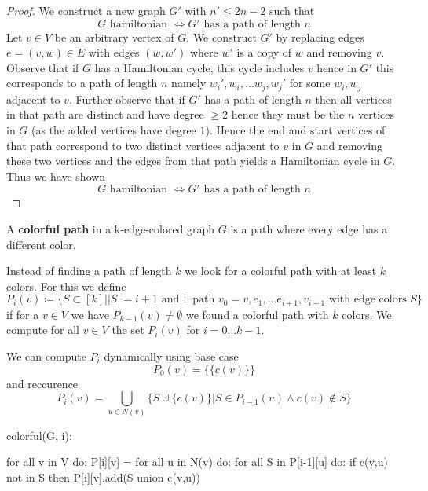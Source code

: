 \begin{proof}
	We construct a new graph $G'$ with $n' \leq 2n-2$ such that
	$$G \text{ hamiltonian } \iff G' \text{ has a path of length } n$$
	Let $v \in V$ be an arbitrary vertex of $G$. We construct $G'$ by replacing edges $e = (v, w) \in E$ with edges $(w, w')$ where $w'$ is a copy of $w$ and removing $v$.
	Observe that if $G$ has a Hamiltonian cycle, this cycle includes $v$ hence in $G'$ this corresponds to a path of length $n$ namely $w_i', w_i, \dots w_j, w_j'$ for some $w_i, w_j$ adjacent to $v$.
	Further observe that if $G'$ has a path of length $n$ then all vertices in that path are distinct and have degree $\geq 2$ hence they must be the $n$ vertices in $G$ (as the added vertices have degree $1$). Hence the end and start vertices of that path correspond to two distinct vertices adjacent to $v$ in $G$ and removing these two vertices and the edges from that path yields a Hamiltonian cycle in $G$.
	Thus we have shown
	$$G \text{ hamiltonian } \iff G' \text{ has a path of length } n$$
\end{proof}

\begin{definition}
	A \textbf{colorful path} in a k-edge-colored graph $G$ is a path where every edge has a different color.
\end{definition}

\begin{remark}
	Instead of finding a path of length $k$ we look for a colorful path with at least $k$ colors. For this we define
	$$P_i(v) \coloneqq \{ S\subset [k] | |S|=i+1 \text{ and } \exists\text{ path } v_0=v, e_1, \dots e_{i+1}, v_{i+1}\text{ with edge colors }S \}$$
	if for a $v \in V$ we have $P_{k-1}(v) \neq \emptyset$ we found a colorful path with $k$ colors. We compute for all $v \in V$ the set $P_i(v)$ for $i=0 \dots k-1$.
\end{remark}

\begin{lemma}
	We can compute $P_i$ dynamically using base case
	$$P_0(v) = \{ \{c(v)\} \}$$
	and reccurence
	$$P_i(v) = \bigcup_{u \in N(v)} \{S \cup \{c(v)\} | S \in P_{i-1}(u) \land c(v) \notin S \}$$
\end{lemma}

\begin{algorithm}
	colorful(G, i):

	for all v in V do:
	P[i][v] = {}
	for all u in N(v) do:
	for all S in P[i-1][u] do:
	if c(v,u) not in S then
	P[i][v].add(S union {c(v,u)})
\end{algorithm}

